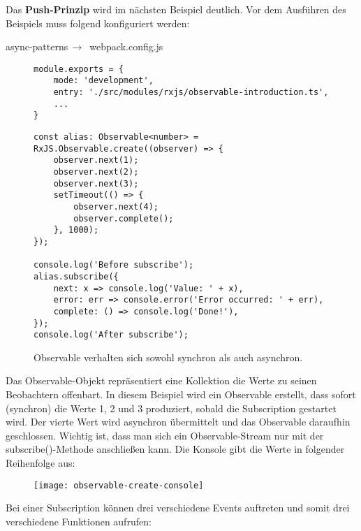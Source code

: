 \noindent
Das \textbf{Push-Prinzip} wird im nächsten Beispiel deutlich. Vor dem Ausführen des Beispiels muss folgend konfiguriert werden:

\begin{center}
     async-patterns$\,\to\,$ webpack.config.js
\end{center}

\begin{figure}[H]
\begin{lstlisting}[basicstyle=\small]
module.exports = {
    mode: 'development',
    entry: './src/modules/rxjs/observable-introduction.ts',
    ...
}
\end{lstlisting}
\end{figure}

\begin{figure}[H]
\begin{lstlisting}[basicstyle=\small]
const alias: Observable<number> = RxJS.Observable.create((observer) => {
    observer.next(1);
    observer.next(2);
    observer.next(3);
    setTimeout(() => {
        observer.next(4);
        observer.complete();
    }, 1000);
});

console.log('Before subscribe');
alias.subscribe({
    next: x => console.log('Value: ' + x),
    error: err => console.error('Error occurred: ' + err),
    complete: () => console.log('Done!'),
});
console.log('After subscribe');
\end{lstlisting}
\caption{Observable verhalten sich sowohl synchron als auch asynchron.}
\end{figure}

\noindent
Das Observable-Objekt repräsentiert eine Kollektion die Werte zu seinen Beobachtern offenbart. In diesem Beispiel wird ein Observable erstellt, dass sofort (synchron) die Werte 1, 2 und 3 produziert, sobald die Subscription gestartet wird. Der vierte Wert wird asynchron übermittelt und das Observable daraufhin geschlossen. Wichtig ist, dass man sich ein Observable-Stream nur mit der subscribe()-Methode anschließen kann. Die Konsole gibt die Werte in folgender Reihenfolge aus:

\begin{figure}[H]
\begin{center}
\texttt{[image: observable-create-console]}
\end{center}
\end{figure}

\noindent
Bei einer Subscription können drei verschiedene Events auftreten und somit drei verschiedene Funktionen aufrufen:


